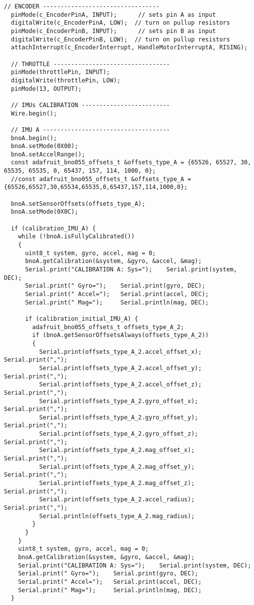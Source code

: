 \begin{lstlisting}[style=codearduino]
  // ENCODER ---------------------------------
  pinMode(c_EncoderPinA, INPUT);      // sets pin A as input
  digitalWrite(c_EncoderPinA, LOW);  // turn on pullup resistors
  pinMode(c_EncoderPinB, INPUT);      // sets pin B as input
  digitalWrite(c_EncoderPinB, LOW);  // turn on pullup resistors
  attachInterrupt(c_EncoderInterrupt, HandleMotorInterruptA, RISING);

  // THROTTLE ---------------------------------
  pinMode(throttlePin, INPUT);
  digitalWrite(throttlePin, LOW);
  pinMode(13, OUTPUT);

  // IMUs CALIBRATION -------------------------
  Wire.begin();

  // IMU A ------------------------------------
  bnoA.begin();
  bnoA.setMode(0X00);
  bnoA.setAccelRange();
  const adafruit_bno055_offsets_t &offsets_type_A = {65526, 65527, 30, 65535, 65535, 0, 65437, 157, 114, 1000, 0};
  //const adafruit_bno055_offsets_t &offsets_type_A = {65526,65527,30,65534,65535,0,65437,157,114,1000,0};

  bnoA.setSensorOffsets(offsets_type_A);
  bnoA.setMode(0X0C);

  if (calibration_IMU_A) {
    while (!bnoA.isFullyCalibrated())
    {
      uint8_t system, gyro, accel, mag = 0;
      bnoA.getCalibration(&system, &gyro, &accel, &mag);
      Serial.print("CALIBRATION A: Sys=");    Serial.print(system, DEC);
      Serial.print(" Gyro=");    Serial.print(gyro, DEC);
      Serial.print(" Accel=");   Serial.print(accel, DEC);
      Serial.print(" Mag=");     Serial.println(mag, DEC);

      if (calibration_initial_IMU_A) {
        adafruit_bno055_offsets_t offsets_type_A_2;
        if (bnoA.getSensorOffsetsAlways(offsets_type_A_2))
        {
          Serial.print(offsets_type_A_2.accel_offset_x);    Serial.print(",");
          Serial.print(offsets_type_A_2.accel_offset_y);    Serial.print(",");
          Serial.print(offsets_type_A_2.accel_offset_z);    Serial.print(",");
          Serial.print(offsets_type_A_2.gyro_offset_x);    Serial.print(",");
          Serial.print(offsets_type_A_2.gyro_offset_y);    Serial.print(",");
          Serial.print(offsets_type_A_2.gyro_offset_z);    Serial.print(",");
          Serial.print(offsets_type_A_2.mag_offset_x);    Serial.print(",");
          Serial.print(offsets_type_A_2.mag_offset_y);    Serial.print(",");
          Serial.print(offsets_type_A_2.mag_offset_z);    Serial.print(",");
          Serial.print(offsets_type_A_2.accel_radius);    Serial.print(",");
          Serial.println(offsets_type_A_2.mag_radius);
        }
      }
    }
    uint8_t system, gyro, accel, mag = 0;
    bnoA.getCalibration(&system, &gyro, &accel, &mag);
    Serial.print("CALIBRATION A: Sys=");    Serial.print(system, DEC);
    Serial.print(" Gyro=");    Serial.print(gyro, DEC);
    Serial.print(" Accel=");   Serial.print(accel, DEC);
    Serial.print(" Mag=");     Serial.println(mag, DEC);
  }


\end{lstlisting}
